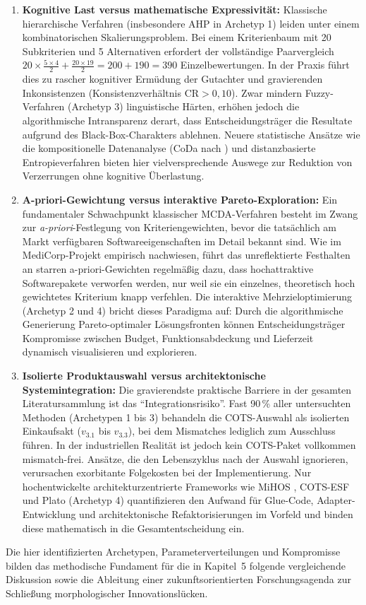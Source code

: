 \begin{enumerate}[label=\textbf{\arabic*.}, leftmargin=*]
  \item \textbf{Kognitive Last versus mathematische Expressivität:}  
  Klassische hierarchische Verfahren (insbesondere AHP in Archetyp 1) leiden unter einem kombinatorischen Skalierungsproblem. Bei einem Kriterienbaum mit 20 Subkriterien und 5 Alternativen erfordert der vollständige Paarvergleich $20 \times \frac{5 \times 4}{2} + \frac{20 \times 19}{2} = 200 + 190 = 390$ Einzelbewertungen. In der Praxis führt dies zu rascher kognitiver Ermüdung der Gutachter und gravierenden Inkonsistenzen (Konsistenzverhältnis $\text{CR} > 0,10$). Zwar mindern Fuzzy-Verfahren (Archetyp 3) linguistische Härten, erhöhen jedoch die algorithmische Intransparenz derart, dass Entscheidungsträger die Resultate aufgrund des Black-Box-Charakters ablehnen. Neuere statistische Ansätze wie die kompositionelle Datenanalyse (CoDa nach \parencite{UK2X9C4W}) und distanzbasierte Entropieverfahren \parencite{FVINCQ89} bieten hier vielversprechende Auswege zur Reduktion von Verzerrungen ohne kognitive Überlastung.
  
  \item \textbf{A-priori-Gewichtung versus interaktive Pareto-Exploration:}  
  Ein fundamentaler Schwachpunkt klassischer MCDA-Verfahren besteht im Zwang zur \textit{a-priori}-Festlegung von Kriteriengewichten, bevor die tatsächlich am Markt verfügbaren Softwareeigenschaften im Detail bekannt sind. Wie \textcite{MZ8JHDYA} im MediCorp-Projekt empirisch nachwiesen, führt das unreflektierte Festhalten an starren a-priori-Gewichten regelmäßig dazu, dass hochattraktive Softwarepakete verworfen werden, nur weil sie ein einzelnes, theoretisch hoch gewichtetes Kriterium knapp verfehlen. Die interaktive Mehrzieloptimierung (Archetyp 2 und 4) bricht dieses Paradigma auf: Durch die algorithmische Generierung Pareto-optimaler Lösungsfronten können Entscheidungsträger Kompromisse zwischen Budget, Funktionsabdeckung und Lieferzeit dynamisch visualisieren und explorieren.
  
  \item \textbf{Isolierte Produktauswahl versus architektonische Systemintegration:}  
  Die gravierendste praktische Barriere in der gesamten Literatursammlung ist das \enquote{Integrationsrisiko}. Fast 90\,\% aller untersuchten Methoden (Archetypen 1 bis 3) behandeln die COTS-Auswahl als isolierten Einkaufsakt ($v_{3.1}$ bis $v_{3.3}$), bei dem Mismatches lediglich zum Ausschluss führen. In der industriellen Realität ist jedoch kein COTS-Paket vollkommen mismatch-frei. Ansätze, die den Lebenszyklus nach der Auswahl ignorieren, verursachen exorbitante Folgekosten bei der Implementierung. Nur hochentwickelte architekturzentrierte Frameworks wie MiHOS \parencite{9F79VAAB}, COTS-ESF \parencite{WZM7DUBY} und Plato \parencite{8VHUMEKY} (Archetyp 4) quantifizieren den Aufwand für Glue-Code, Adapter-Entwicklung und architektonische Refaktorisierungen im Vorfeld und binden diese mathematisch in die Gesamtentscheidung ein.
\end{enumerate}

Die hier identifizierten Archetypen, Parameterverteilungen und Kompromisse bilden das methodische Fundament für die in Kapitel~5 folgende vergleichende Diskussion sowie die Ableitung einer zukunftsorientierten Forschungsagenda zur Schließung morphologischer Innovationslücken.
